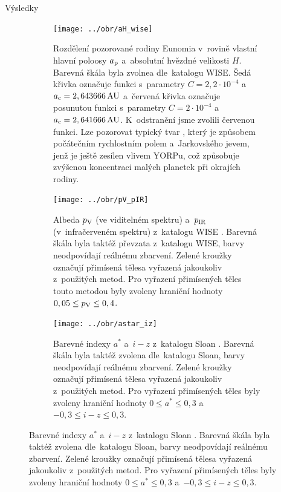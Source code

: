 \documentclass{beamer}
\newlength{\vyskaA}
\newlength{\vyskaB}
\newlength{\main}
\begin{document}
\begin{frame}
\begin{columns}[t]
\begin{column}{\main}
\printlength{\vyskaA}
	\begin{block}{Výsledky\phantom{Úy}}
		\begin{minipage}[t][1.0\vyskaB][t]{\textwidth}
			\begin{figure}
				\centering
				\begin{subfigure}[t]{0.3\textwidth}
					\centering
					\texttt{[image: ../obr/aH\_wise]}
					\caption{Rozdělení pozorované rodiny Eunomia v~rovině vlastní hlavní poloosy $a_{\rm p}$ a~absolutní hvězdné velikosti $H$. Barevná škála byla zvolnea dle~katalogu WISE. Šedá křivka označuje funkci s~parametry ${C=2,2\cdot10^{-4}}$ a~${a_{\rm c}=2,643666\,{\rm AU}}$ a~červená křivka označuje posunutou funkci s~parametry ${C=2\cdot10^{-4}}$ a~${a_{\rm c}=2,641666\,{\rm AU}}$. K~odstranění  jsme zvolili červenou funkci. Lze pozorovat typický tvar , který je způsobem počátečním rychlostním polem a~Jarkovského jevem, jenž je ještě zesílen vlivem YORPu, což způsobuje zvýšenou koncentraci malých planetek při okrajích rodiny.}
					\label{fig:aH_wise}
				\end{subfigure}
				\begin{subfigure}[t]{0.3\textwidth}
					\centering
					\texttt{[image: ../obr/pV\_pIR]}
					\caption{Albeda $p_{\rm V}$ (ve viditelném spektru) a~$p_{\rm IR}$ (v~infračerveném spektru) z~katalogu WISE \cite{nugent15}. Barevná škála byla taktéž převzata z~katalogu WISE, barvy neodpovídají reálnému zbarvení. Zelené kroužky označují přimísená tělesa vyřazená jakoukoliv z~použitých metod. Pro vyřazení přimísených těles touto metodou byly zvoleny hraniční hodnoty $0,05 \leq p_{\rm V} \leq 0,4$.}
					\label{fig:pV_pIR}
				\end{subfigure}
				\begin{subfigure}[t]{0.3\textwidth}
					\centering
					\texttt{[image: ../obr/astar\_iz]}
					\caption{Barevné indexy $a^*$ a~$i-z$ z~katalogu Sloan \cite{ivezic01}. Barevná škála byla taktéž zvolena dle~katalogu Sloan, barvy neodpovídají reálnému zbarvení. Zelené kroužky označují přimísená tělesa vyřazená jakoukoliv z~použitých metod. Pro vyřazení přimísených těles byly zvoleny hraniční hodnoty $0\leq a^* \leq 0,3$ a~$-0,3\leq i-z \leq 0,3$.}
					\label{fig:astar_iz}
				\end{subfigure}
			\end{figure}


\end{minipage}
\end{block}
\end{column}
\end{columns}
\end{frame}
\end{document}
